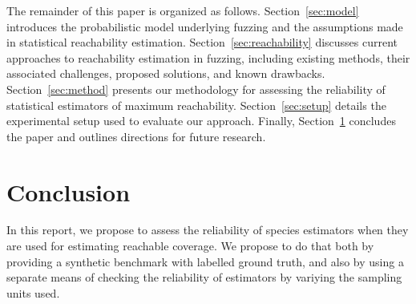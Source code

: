 \documentclass[conference]{IEEEtran}
\begin{document}
The remainder of this paper is organized as follows. Section~\ref{sec:model} introduces the probabilistic model underlying fuzzing and the assumptions made in statistical reachability estimation. Section~\ref{sec:reachability} discusses current approaches to reachability estimation in fuzzing, including existing methods, their associated challenges, proposed solutions, and known drawbacks. Section~\ref{sec:method} presents our methodology for assessing the reliability of statistical estimators of maximum reachability. Section~\ref{sec:setup} details the experimental setup used to evaluate our approach. Finally, Section~\ref{sec:conclusion} concludes the paper and outlines directions for future research.







\section{Conclusion}
\label{sec:conclusion}
In this report, we propose to assess the reliability of species estimators when
they are used for estimating reachable coverage. We propose to do that both by
providing a synthetic benchmark with labelled ground truth, and also by
using a separate means of checking the reliability of estimators by variying
the sampling units used.








\end{document}
